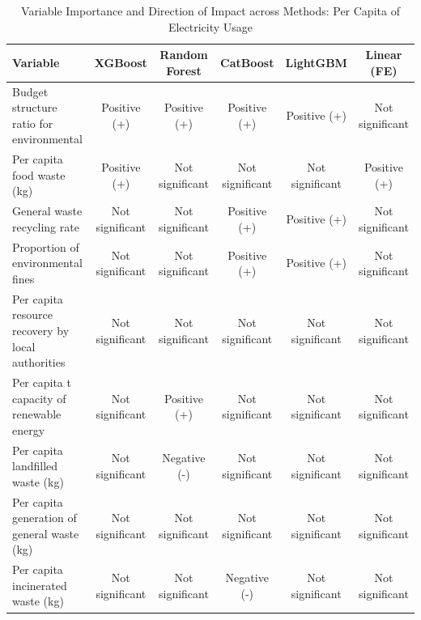 \documentclass{article}
\begin{document}
\begin{table}[H]
\centering
\tiny
\caption{Variable Importance and Direction of Impact across Methods: Per Capita of Electricity Usage}
\label{tab:var_impact_summary}
\begin{tabular}{lccccc}
\toprule
\textbf{Variable} & \textbf{XGBoost} & \textbf{Random Forest} & \textbf{CatBoost} & \textbf{LightGBM} & \textbf{Linear (FE)} \\
\midrule
Budget structure ratio for environmental & Positive (+) & Positive (+) & Positive (+) & Positive (+) & Not significant \\
Per capita food waste (kg) & Positive (+) & Not significant & Not significant & Not significant & Positive (+) \\
General waste recycling rate & Not significant & Not significant & Positive (+) & Positive (+) & Not significant \\
Proportion of environmental fines & Not significant & Not significant & Positive (+) & Positive (+) & Not significant \\
Per capita resource recovery by local authorities & Not significant & Not significant & Not significant & Not significant & Not significant \\
Per capita t capacity of renewable energy & Not significant & Positive (+) & Not significant & Not significant & Not significant \\
Per capita landfilled waste (kg) & Not significant & Negative (-) & Not significant & Not significant & Not significant \\
Per capita generation of general waste (kg) & Not significant & Not significant & Not significant & Not significant & Not significant \\
Per capita incinerated waste (kg) & Not significant & Not significant & Negative (-) & Not significant & Not significant \\
\bottomrule
\end{tabular}
\end{table}
\end{document}

